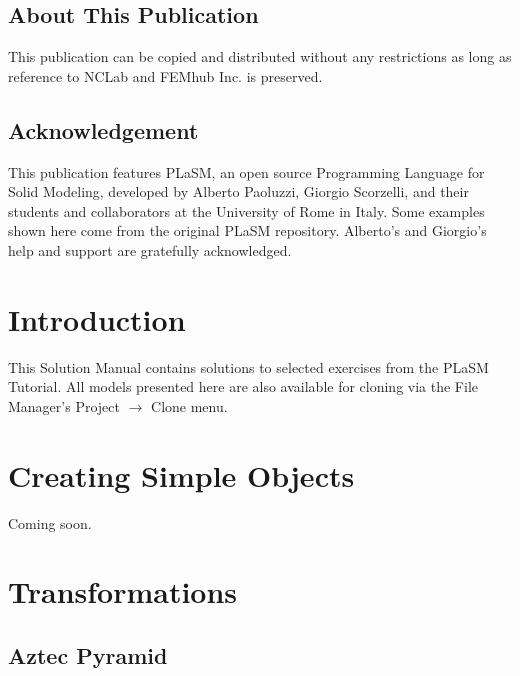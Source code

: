 \documentclass[article,A4,12pt]{llncs}
\begin{document}
\subsection*{About This Publication}
This publication can be copied and distributed without any restrictions
as long as reference to NCLab and FEMhub Inc. is preserved.

\subsection*{Acknowledgement}
This publication features PLaSM, an open source Programming Language for 
Solid Modeling, developed by Alberto Paoluzzi, Giorgio Scorzelli, and their 
students and collaborators at the University of Rome in Italy. Some examples 
shown here come from the original PLaSM repository. Alberto's 
and Giorgio's help and support are gratefully acknowledged. 

\normalsize

\newpage
\setcounter{tocdepth}{2}
\tableofcontents

\newpage

\pagestyle{plain}
\setcounter{page}{1}


\section{Introduction}

This Solution Manual contains solutions to selected exercises from the 
PLaSM Tutorial. All models presented here are also available for 
cloning via the File Manager's Project $\rightarrow$ Clone menu.

\section{Creating Simple Objects}

Coming soon.


\section{Transformations}

\subsection{Aztec Pyramid}
\end{document}
